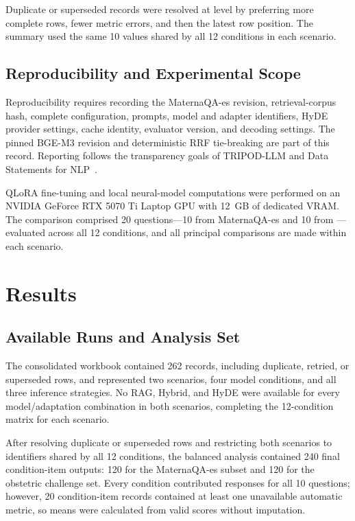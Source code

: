 Duplicate or superseded records were resolved at  level by
preferring more complete rows, fewer metric errors, and then the latest row
position. The summary used the same 10  values shared by all 12
conditions in each scenario.

\subsection{Reproducibility and Experimental Scope}
Reproducibility requires recording the MaternaQA-es revision,
retrieval-corpus hash, complete configuration, prompts, model and adapter
identifiers, HyDE provider settings, cache identity, evaluator version, and
decoding settings. The pinned BGE-M3 revision and deterministic RRF
tie-breaking are part of this record. Reporting follows the transparency
goals of TRIPOD-LLM and Data Statements for
NLP~\cite{gallifant2025tripod,bender2018data}.

QLoRA fine-tuning and local neural-model computations were performed on an
NVIDIA GeForce RTX 5070 Ti Laptop GPU with 12~GB of dedicated VRAM.
The comparison comprised 20 questions---10 from MaternaQA-es and 10 from
---evaluated across all 12 conditions, and all principal
comparisons are made within each scenario.

\section{Results}
\subsection{Available Runs and Analysis Set}
The consolidated workbook contained 262 records, including duplicate,
retried, or superseded rows, and represented two scenarios, four model
conditions, and all three inference strategies. No RAG, Hybrid, and
HyDE were available for every model/adaptation combination in both
scenarios, completing the 12-condition matrix for each scenario.

After resolving duplicate or superseded rows and restricting both scenarios
to identifiers shared by all 12 conditions, the balanced analysis contained
240 final condition-item outputs: 120 for the MaternaQA-es subset and 120
for the obstetric challenge set. Every condition contributed responses for
all 10 questions; however, 20 condition-item records contained at least one
unavailable automatic metric, so means were calculated from valid scores
without imputation.

